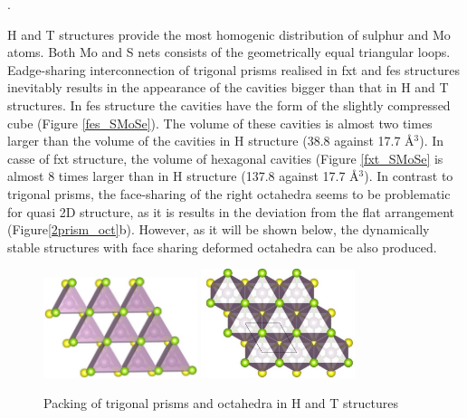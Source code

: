 .\documentclass[a4paperm]{article}
\begin{document}
H and T structures provide the most homogenic distribution of sulphur and Mo atoms. 
Both Mo and S nets consists of the geometrically equal triangular loops.
Eadge-sharing interconnection of trigonal prisms realised in fxt and fes structures inevitably results in the appearance of the cavities bigger than that in H and T structures. 
In fes structure the cavities have the form of the slightly compressed cube (Figure \ref{fes_SMoSe}).
The volume of these cavities is almost two times larger than the volume of the cavities in H structure (38.8 against 17.7 \AA$^3$).
In casse of fxt structure, the volume of hexagonal cavities (Figure \ref{fxt_SMoSe} is almost 8 times larger than in H structure (137.8 against 17.7 \AA$^3$).
In contrast to trigonal prisms, the face-sharing of the right octahedra seems to be problematic for quasi 2D structure, as it is results in the deviation from the flat arrangement (Figure\ref{2prism_oct}b).
However, as it will be shown below, the dynamically stable structures with face sharing deformed octahedra can be also produced. 


\begin{figure}[H]
        \includegraphics[width=0.4\textwidth]{1H.jpg}
        \includegraphics[width=0.4\textwidth]{1T.jpg}
        \caption{Packing of trigonal prisms and octahedra in H and T structures}
\label{1H1T}
\label{fes_fxt}
\end{figure}
\end{document}
